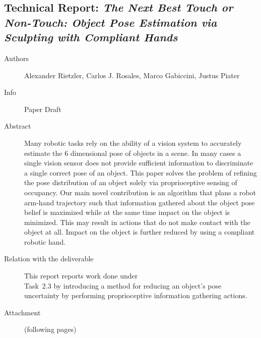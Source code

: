 \documentclass[a4paper,11pt,pdf]{pacmanreport}
\begin{document}
\subsection{Technical Report: \em The Next Best Touch or Non-Touch:
Object Pose Estimation via Sculpting with Compliant Hands}
\begin{description}
    \item[Authors] Alexander Rietzler, Carlos J. Rosales, Marco Gabiccini, Justus Piater
    \item[Info] Paper Draft%
    \item[Abstract] Many robotic tasks rely on the ability of a vision system to accurately estimate the 6 dimensional pose of objects in a scene.
In many cases a single vision sensor does not provide sufficient information to discriminate a single correct
pose of an object. 
This paper solves the problem of refining the pose distribution 
of an object solely via proprioceptive sensing of occupancy.
Our main novel contribution is an algorithm that plans a robot arm-hand trajectory such that 
information gathered about the object pose belief is maximized while at the same time impact on the object is minimized. 
This may result in actions that do not make contact with the object at all.
Impact on the object is further reduced by using a compliant robotic hand.
    \item [Relation with the deliverable] This report reports work done under\\ Task~2.3 by introducing a method for reducing an object's pose uncertainty by performing proprioceptive information
    gathering actions.
    \item[Attachment] (following pages) %
\end{description}

\end{document}
